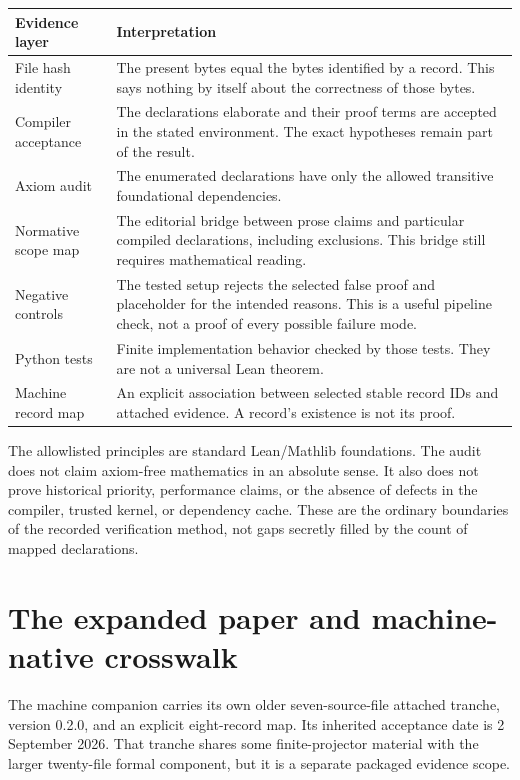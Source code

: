 \documentclass[11pt,a4paper]{article}
\begin{document}
\begin{longtable}{p{}p{}}
\toprule Evidence layer & Interpretation \\\midrule\endhead
File hash identity & The present bytes equal the bytes identified by a record. This says nothing by itself about the correctness of those bytes. \\
Compiler acceptance & The declarations elaborate and their proof terms are accepted in the stated environment. The exact hypotheses remain part of the result. \\
Axiom audit & The enumerated declarations have only the allowed transitive foundational dependencies. \\
Normative scope map & The editorial bridge between prose claims and particular compiled declarations, including exclusions. This bridge still requires mathematical reading. \\
Negative controls & The tested setup rejects the selected false proof and placeholder for the intended reasons. This is a useful pipeline check, not a proof of every possible failure mode. \\
Python tests & Finite implementation behavior checked by those tests. They are not a universal Lean theorem. \\
Machine record map & An explicit association between selected stable record IDs and attached evidence. A record's existence is not its proof. \\
\bottomrule
\end{longtable}

The allowlisted principles are standard Lean/Mathlib foundations. The audit does not claim axiom-free mathematics in an absolute sense. It also does not prove historical priority, performance claims, or the absence of defects in the compiler, trusted kernel, or dependency cache. These are the ordinary boundaries of the recorded verification method, not gaps secretly filled by the count of mapped declarations.

\section{The expanded paper and machine-native crosswalk}

The machine companion carries its own older seven-source-file attached tranche, version 0.2.0, and an explicit eight-record map. Its inherited acceptance date is 2 September 2026. That tranche shares some finite-projector material with the larger twenty-file formal component, but it is a separate packaged evidence scope.
\end{document}
